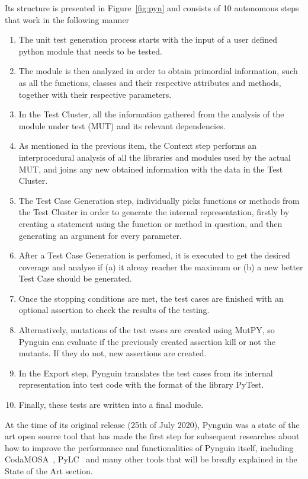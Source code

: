 \documentclass[%
  chapterprefix=false,%
  open=right,%
  twoside=true,%
  paper=a4,%
  logofile={Figures/logo.png},%
  thesistype=master,%
  UKenglish,%
]{se2thesis}
\begin{document}
Its structure is presented in Figure~\ref{fig:pyn} and consists of 10 autonomous steps that work in the following manner
\begin{enumerate}
  \item The unit test generation process starts with the input of a user defined python module that needs to be tested.
  \item The module is then analyzed in order to obtain primordial information, such as all the functions, classes and their respective attributes and methods, together with their respective parameters.
  \item In the Test Cluster, all the information gathered from the analysis of the module under test (MUT) and its relevant dependencies.
  \item As mentioned in the previous item, the Context step performs an interprocedural analysis of all the libraries and modules used by the actual MUT, and joins any new obtained information with the data in the Test Cluster.
  \item The Test Case Generation step, individually picks functions or methods from the Test Cluster in order to generate the internal representation, firstly by creating a statement using the function or method in question, and then generating an argument for every parameter.
  \item After a Test Case Generation is perfomed, it is executed to get the desired coverage and analyse if (a) it alreay reacher the maximum or (b) a new better Test Case should be generated.
  \item Once the stopping conditions are met, the test cases are finished with an optional assertion to check the results of the testing.
  \item Alternatively, mutations of the test cases are created using MutPY, so Pynguin can evaluate if the previously created assertion kill or not the mutants.
  If they do not, new assertions are created.
  \item In the Export step, Pynguin translates the test cases from its internal representation into test code with the format of the library PyTest.
  \item Finally, these tests are written into a final module.
  
\end{enumerate}
At the time of its original release (25th of July 2020), Pynguin was a state of the art open source tool that has made the first step for subsequent researches about how to improve the performance and functionalities of Pynguin itself, including CodaMOSA~\cite{DBLP:conf/icse/LemieuxILS23}, PyLC~\cite{DBLP:conf/sac/SalariEAS23} and many other tools that will be breafly explained in the State of the Art section.
\end{document}

